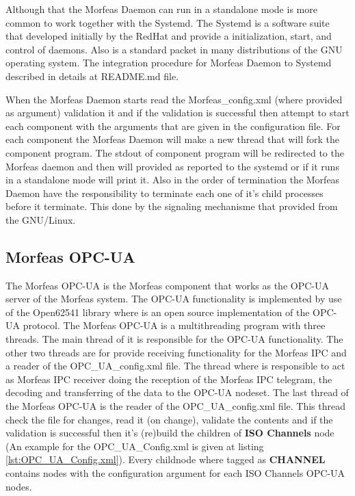 \documentclass{article}
\begin{document}
Although that the Morfeas Daemon can run in a standalone mode is more common to work together with the Systemd. The Systemd is a software suite that developed initially by the RedHat
and provide a initialization, start, and control of daemons. Also is a standard packet in many distributions of the GNU operating system.
The integration procedure for Morfeas Daemon to Systemd described in details at README.md file.

When the Morfeas Daemon starts read the Morfeas\_config.xml (where provided as argument) validation it and if the validation is successful then attempt to start
each component with the arguments that are given in the configuration file. For each component the Morfeas Daemon will make a new thread that will fork the component program.
The stdout of component program will be redirected to the Morfeas daemon and then will provided as reported to the systemd or if it runs in a standalone mode will print it.
Also in the order of termination the Morfeas Daemon have the responsibility to terminate each one of it's child processes before it terminate. This done by the signaling mechanisme that
provided from the GNU/Linux.
\newpage
\subsection{Morfeas OPC-UA}
The Morfeas OPC-UA is the Morfeas component that works as the OPC-UA server of the Morfeas system. The OPC-UA functionality is implemented by use of the Open62541 library where is an open source
implementation of the OPC-UA protocol. The Morfeas OPC-UA is a multithreading program with three threads. The main thread of it is responsible for the OPC-UA functionality. The other two threads are for provide
receiving functionality for the Morfeas IPC and a reader of the OPC\_UA\_config.xml file.
The thread where is responsible to act as Morfeas IPC receiver doing the reception of the Morfeas IPC telegram, the decoding and transferring of the data to the OPC-UA nodeset.
The last thread of the Morfeas OPC-UA is the reader of the OPC\_UA\_config.xml file. This thread check the file for changes, read it (on change), validate the contents and
if the validation is successful then it's (re)build the children of \textbf{ISO Channels} node (An example for the OPC\_UA\_Config.xml is given at listing \ref{lst:OPC_UA_Config.xml}).
Every childnode where tagged as \textbf{CHANNEL} contains nodes with the configuration argument for each ISO Channels OPC-UA nodes.\\
\end{document}
